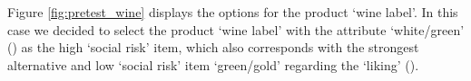 Figure \ref{fig:pretest_wine} displays the options for the product ‘wine label’. In this case we decided to select the product ‘wine label’ with the attribute ‘white/green’ () as the high ‘social risk’ item, which also corresponds with the strongest alternative and low ‘social risk’ item ‘green/gold’ regarding the ‘liking’ (). \par



